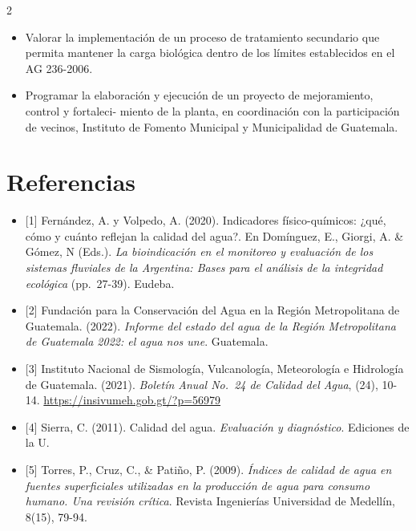 \documentclass[12pt,spanish,Letterpaper,openany]{book}
\begin{document}
\begin {multicols}{2}
\bigskip
\bigskip

\begin{itemize}
\item
  Valorar la implementación de un proceso de tratamiento secundario que permita mantener la carga biológica dentro de los límites establecidos en el AG 236-2006.
\item
  Programar la elaboración y ejecución de un proyecto de mejoramiento, control y fortaleci-
  miento de la planta, en coordinación con la participación de vecinos, Instituto de Fomento Municipal y Municipalidad de Guatemala.
\end{itemize}

\hypertarget{referencias-4}{%
\section{Referencias}\label{referencias-4}}

\begin{itemize}
\item
  {[}1{]} Fernández, A. y Volpedo, A. (2020). Indicadores físico-químicos: ¿qué, cómo y cuánto reflejan la calidad del agua?. En Domínguez, E., Giorgi, A. \& Gómez, N (Eds.). \emph{La bioindicación en el monitoreo y evaluación de los sistemas fluviales de la Argentina: Bases para el análisis de la integridad ecológica} (pp.~27-39). Eudeba.
\item
  {[}2{]} Fundación para la Conservación del Agua en la Región Metropolitana de Guatemala. (2022). \emph{Informe del estado del agua de la Región Metropolitana de Guatemala 2022: el agua nos une}. Guatemala.
\item
  {[}3{]} Instituto Nacional de Sismología, Vulcanología, Meteorología e Hidrología de Guatemala. (2021). \emph{Boletín Anual No.~24 de Calidad del Agua}, (24), 10-14. \url{https://insivumeh.gob.gt/?p=56979}
\item
  {[}4{]} Sierra, C. (2011). Calidad del agua. \emph{Evaluación y diagnóstico}. Ediciones de la U.
\item
  {[}5{]} Torres, P., Cruz, C., \& Patiño, P. (2009). \emph{Índices de calidad de agua en fuentes superficiales utilizadas en la producción de agua para consumo humano. Una revisión crítica}. Revista Ingenierías Universidad de Medellín, 8(15), 79-94.
\end{itemize}

\end {multicols}

\medskip
\end{document}
